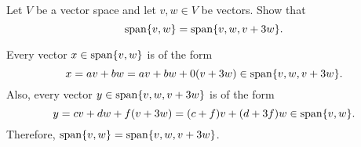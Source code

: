 \documentclass{ximera}
\begin{document}
\begin{exercise} \label{c5.2.8b}
Let $V$ be a vector space and let $v,w\in V$ be vectors.  Show that
\[
{\rm span}\{v,w\}={\rm span}\{v,w,v+3w\}.
\]

\begin{solution}
Every vector $x \in {\rm span}\{v,w\}$ is of the form 
\[
x = av + bw = av + bw + 0(v + 3w) \in {\rm span}\{v,w,v+3w\}.
\]
  Also, every vector $y \in {\rm span}\{v,w,v+3w\}$ is of the form
\[
y = cv + dw + f(v + 3w) = (c + f)v + (d + 3f)w \in {\rm span}\{v,w\}.
\]
Therefore, ${\rm span}\{v,w\} = {\rm span}\{v,w,v+3w\}$.

\end{solution}
\end{exercise}
\end{document}
